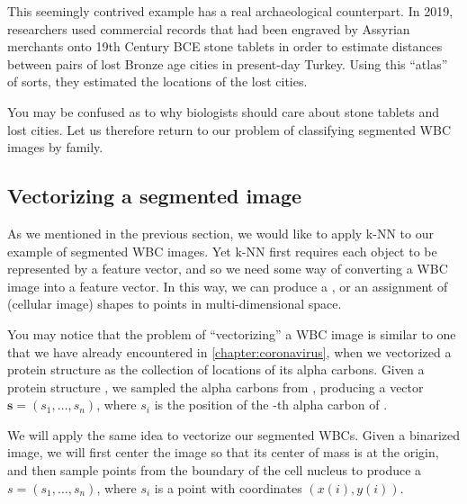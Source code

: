 \begin{qbox}\end{qbox}

This seemingly contrived example has a real archaeological counterpart. In 2019, researchers used commercial records that had been engraved by Assyrian merchants onto 19th Century BCE stone tablets in order to estimate distances between pairs of lost Bronze age cities in present-day Turkey. Using this ``atlas'' of sorts, they estimated the locations of the lost cities.

You may be confused as to why biologists should care about stone tablets and lost cities. Let us therefore return to our problem of classifying segmented WBC images by family.

\FloatBarrier
{}
\subsection{Vectorizing a segmented image}

As we mentioned in the previous section, we would like to apply k-NN to our example of segmented WBC images. Yet k-NN first requires each object to be represented by a feature vector, and so we need some way of converting a WBC image into a feature vector. In this way, we can produce a , or an assignment of (cellular image) shapes to points in multi-dimensional space.

You may notice that the problem of ``vectorizing'' a WBC image is similar to one that we have already encountered in \autoref{chapter:coronavirus}, when we vectorized a protein structure as the collection of locations of its alpha carbons. Given a protein structure , we sampled the  alpha carbons from , producing a vector $\mathbf{s} = (s_1, \ldots, s_n)$, where $s_i$ is the position of the -th alpha carbon of .

We will apply the same idea to vectorize our segmented WBCs. Given a binarized image, we will first center the image so that its center of mass is at the origin, and then sample  points from the boundary of the cell nucleus to produce a  $s = (s_1, \ldots, s_n)$, where $s_i$ is a point with coordinates $(x(i), y(i))$.\\

